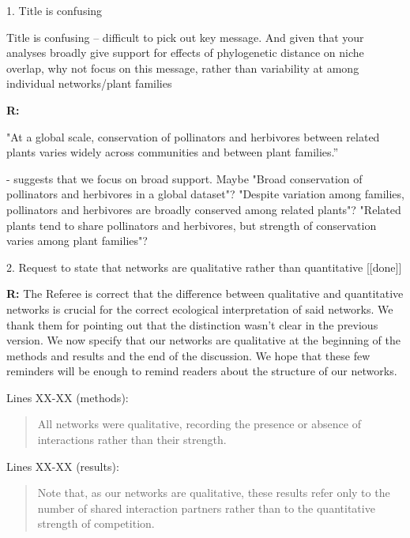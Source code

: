 \documentclass[12pt]{letter}
\newenvironment{refquote}{\bigskip \begin{it}}{\end{it}\smallskip}
\begin{document}
	1. Title is confusing

		\begin{refquote}
			Title is confusing – difficult to pick out key message. And given that your analyses broadly give support for effects of phylogenetic distance on niche overlap, why not focus on this message, rather than variability at among individual networks/plant families
		\end{refquote}


		\textbf{R:} 


"At a global scale, conservation of pollinators and herbivores between related plants varies widely across communities and between plant families.”

- suggests that we focus on broad support. Maybe "Broad conservation of pollinators and herbivores in a global dataset"?
"Despite variation among families, pollinators and herbivores are broadly conserved among related plants"?
"Related plants tend to share pollinators and herbivores, but strength of conservation varies among plant families"?

	2. Request to state that networks are qualitative rather than quantitative [[done]]

		\textbf{R:} The Referee is correct that the difference between qualitative and quantitative networks is crucial for the correct ecological interpretation of said networks. We thank them for pointing out that the distinction wasn't clear in the previous version. We now specify that our networks are qualitative at the beginning of the methods and results and the end of the discussion. We hope that these few reminders will be enough to remind readers about the structure of our networks.

		Lines XX-XX (methods):

		\begin{quotation}

			All networks were qualitative, recording the presence or 
		    absence of interactions rather than their strength.

		\end{quotation}


		Lines XX-XX (results):
		
		\begin{quotation}

			Note that, as our networks 
		    are qualitative, these results refer only to the number of shared interaction
	    	partners rather than to the quantitative strength of competition.

    	\end{quotation}
\end{document}
